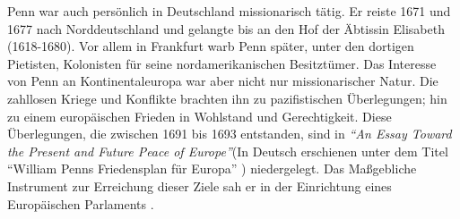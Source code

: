 \medskip

Penn war auch persönlich in Deutschland missionarisch tätig. Er reiste 1671 und 1677
nach Norddeutschland und gelangte bis an den Hof
der Äbtissin Elisabeth (1618-1680). Vor
allem in Frankfurt warb Penn später, unter den dortigen
Pietisten,
Kolonisten für seine nordamerikanischen
 Besitztümer. Das Interesse von Penn an Kontinentaleuropa war
aber nicht nur missionarischer Natur. Die zahllosen Kriege und Konflikte brachten
ihn zu pazifistischen
Überlegungen; hin zu einem europäischen Frieden in
Wohlstand und Gerechtigkeit. Diese Überlegungen, die
zwischen 1691 bis 1693 entstanden, sind in \textit{"`An Essay Toward the Present and Future
Peace of Europe"'}(In Deutsch erschienen unter dem Titel "`William Penns
Friedensplan für Europa"' ) niedergelegt. Das Maßgebliche Instrument zur
Erreichung dieser Ziele sah er in der Einrichtung eines Europäischen Parlaments
.


